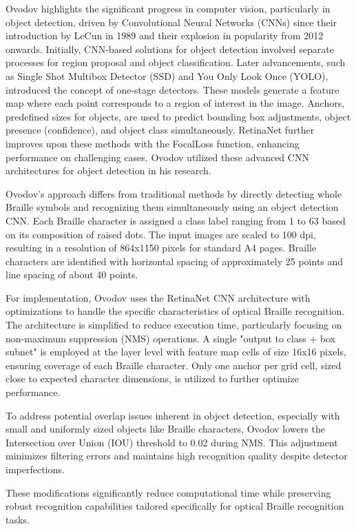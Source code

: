 Ovodov highlights the significant progress in computer vision, particularly in object detection, driven by Convolutional Neural Networks (CNNs) since their introduction by LeCun in 1989 and their explosion in popularity from 2012 onwards. Initially, CNN-based solutions for object detection involved separate processes for region proposal and object classification. Later advancements, such as Single Shot Multibox Detector (SSD) and You Only Look Once (YOLO), introduced the concept of one-stage detectors. These models generate a feature map where each point corresponds to a region of interest in the image. Anchors, predefined sizes for objects, are used to predict bounding box adjustments, object presence (confidence), and object class simultaneously. RetinaNet further improves upon these methods with the FocalLoss function, enhancing performance on challenging cases. Ovodov utilized these advanced CNN architectures for object detection in his research.

Ovodov's approach differs from traditional methods by directly detecting whole Braille symbols and recognizing them simultaneously using an object detection CNN. Each Braille character is assigned a class label ranging from 1 to 63 based on its composition of raised dots. The input images are scaled to 100 dpi, resulting in a resolution of 864x1150 pixels for standard A4 pages. Braille characters are identified with horizontal spacing of approximately 25 points and line spacing of about 40 points.

For implementation, Ovodov uses the RetinaNet CNN architecture with optimizations to handle the specific characteristics of optical Braille recognition. The architecture is simplified to reduce execution time, particularly focusing on non-maximum suppression (NMS) operations. A single "output to class + box subnet" is employed at the layer level with feature map cells of size 16x16 pixels, ensuring coverage of each Braille character. Only one anchor per grid cell, sized close to expected character dimensions, is utilized to further optimize performance.

To address potential overlap issues inherent in object detection, especially with small and uniformly sized objects like Braille characters, Ovodov lowers the Intersection over Union (IOU) threshold to 0.02 during NMS. This adjustment minimizes filtering errors and maintains high recognition quality despite detector imperfections.

These modifications significantly reduce computational time while preserving robust recognition capabilities tailored specifically for optical Braille recognition tasks.



